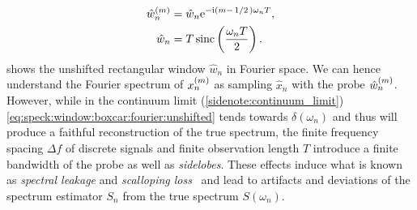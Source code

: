\begin{align}
    \hat{w}_n\gth{m} &= \hat{w}_n \e^{-\i(m - \flatfrac{1}{2})\omega_n T}, \label{eq:speck:window:boxcar:fourier}\\
             \hat{w}_n &= T\sinc\left(\frac{\omega_n T}{2}\right). \label{eq:speck:window:boxcar:fourier:unshifted}
\end{align}
 shows the unshifted rectangular window $\hat{w}_n$ in Fourier space.
We can hence understand the Fourier spectrum of $x_n^{(m)}$ as sampling $\hat{x}_n$ with the probe $\hat{w}_n^{(m)}$.
However, while in the continuum limit (\cf \cref{sidenote:continuum_limit}) \cref{eq:speck:window:boxcar:fourier:unshifted} tends towards $\delta(\omega_n)$ and thus will produce a faithful reconstruction of the true spectrum, the finite frequency spacing $\Delta f$ of discrete signals and finite observation length $T$ introduce a finite bandwidth of the probe as well as \emph{sidelobes}.
These effects induce what is known as \emph{spectral leakage} and \emph{scalloping loss}~\cite{Harris1978,Koopmans1995} and lead to artifacts and deviations of the spectrum estimator $S_n$ from the true spectrum $S(\omega_n)$.

